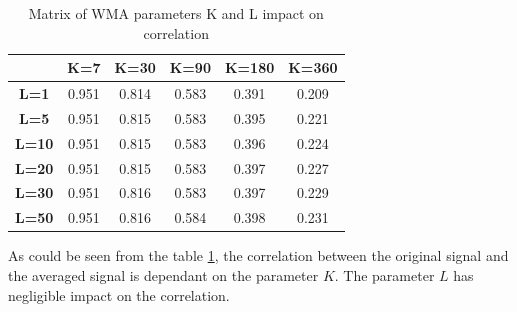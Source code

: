\documentclass[a4paper,12pt,fleqn]{article}
\begin{document}
                \begin{table}[ht]
                    \centering
                    \begin{tabular}{|c|c|c|c|c|c|}
                        \hline
                        & \textbf{K=7} & \textbf{K=30} & \textbf{K=90} & \textbf{K=180} & \textbf{K=360} \\
                        \hline
                        \textbf{L=1} &0.951&0.814 &0.583 &0.391 &0.209 \\
                        \hline
                        \textbf{L=5} &0.951 &0.815 &0.583&0.395 &0.221\\
                        \hline
                        \textbf{L=10} &0.951 &0.815 &0.583&0.396 &0.224 \\
                        \hline
                        \textbf{L=20} &0.951 &0.815 &0.583&0.397&0.227 \\
                        \hline
                        \textbf{L=30} &0.951 &0.816 &0.583& 0.397&0.229 \\
                        \hline
                        \textbf{L=50} &0.951 &0.816 &0.584 &0.398 &0.231 \\
                        \hline
                    \end{tabular}
                    \caption{Matrix of WMA parameters K and L impact on correlation}
                    \label{tab:KL_values}
                \end{table}

                As could be seen from the table \ref{tab:KL_values}, the correlation between the original signal and the averaged signal
                is dependant on the parameter \begin{math}
                    K
                \end{math}. The parameter \begin{math}
                    L
                    \end{math} has negligible impact on the correlation.
\end{document}
